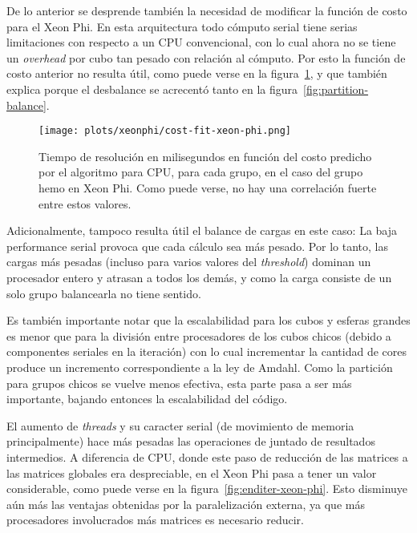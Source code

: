 De lo anterior se desprende tambi\'en la necesidad de modificar la funci\'on de costo
para el Xeon Phi. En esta arquitectura todo c\'omputo serial tiene serias limitaciones
con respecto a un CPU convencional, con
lo cual ahora no se tiene un \textit{overhead} por cubo tan pesado con relaci\'on
al c\'omputo. Por esto la funci\'on de costo anterior no resulta \'util, como
puede verse en la figura~\ref{fig:cost-function-xeon-phi}, y que tambi\'en explica
porque el desbalance se acrecent\'o tanto en la figura~\ref{fig:partition-balance}.

\begin{figure}[htbp]
   \centering
   \texttt{[image: plots/xeonphi/cost-fit-xeon-phi.png]}
   \caption{Tiempo de resoluci\'on en milisegundos en funci\'on del costo predicho
   por el algoritmo para CPU, para cada grupo, en el caso del grupo hemo en Xeon Phi.
   Como puede verse, no hay una correlaci\'on fuerte entre estos valores.}
   \label{fig:cost-function-xeon-phi}
\end{figure}

Adicionalmente, tampoco resulta \'util el balance de cargas en este caso: La baja
performance serial provoca que cada c\'alculo sea m\'as pesado. Por lo tanto, las
cargas m\'as pesadas (incluso para varios valores del \textit{threshold}) dominan
un procesador entero y atrasan a todos los dem\'as, y como la carga consiste de
un solo grupo balancearla no tiene sentido.

Es tambi\'en importante notar que la escalabilidad para los cubos
y esferas grandes es menor que para la divisi\'on entre procesadores de los cubos
chicos (debido a componentes seriales
en la iteraci\'on) con lo cual incrementar la cantidad de cores produce un
incremento correspondiente a la ley de Amdahl. Como la partici\'on para grupos
chicos se vuelve menos efectiva, esta parte pasa a ser m\'as importante, bajando
entonces la escalabilidad del c\'odigo.

El aumento de \textit{threads} y su caracter serial (de movimiento de memoria
principalmente) hace m\'as pesadas las operaciones de juntado de resultados intermedios.
A diferencia de CPU, donde este paso de reducci\'on de las matrices a las matrices
globales era despreciable, en el Xeon Phi pasa a tener un valor considerable, como
puede verse en la figura~\ref{fig:enditer-xeon-phi}. Esto disminuye a\'un m\'as
las ventajas obtenidas por la paralelizaci\'on externa, ya que m\'as procesadores
involucrados m\'as matrices es necesario reducir.

